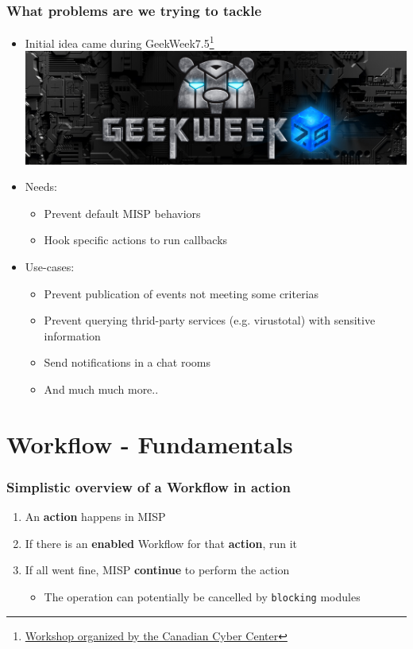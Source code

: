 \begin{frame}
    \frametitle{What problems are we trying to tackle}
    \begin{itemize}
        \item Initial idea came during GeekWeek7.5\footnote{\href{https://cyber.gc.ca/en/events/geekweek-75}{Workshop organized by the Canadian Cyber Center}} \includegraphics[width=0.3\linewidth]{pictures/geekweek75.jpg}
        \item Needs:
        \begin{itemize}
            \item Prevent default MISP behaviors
            \item Hook specific actions to run callbacks
        \end{itemize}
        \item Use-cases:
        \begin{itemize}
            \item Prevent publication of events not meeting some criterias
            \item Prevent querying thrid-party services (e.g. virustotal) with sensitive information
            \item Send notifications in a chat rooms
            \item And much much more..
        \end{itemize}
    \end{itemize}
\end{frame}

\section{Workflow - Fundamentals}
\begin{frame}
    \frametitle{Simplistic overview of a Workflow in action}
    \begin{enumerate}
        \item An \textbf{action} happens in MISP
        \item If there is an \textbf{enabled} Workflow for that \textbf{action}, run it
        \item If all went fine, MISP \textbf{continue} to perform the action
        \begin{itemize}
            \item The operation can potentially be cancelled by \texttt{blocking} modules
        \end{itemize}
    \end{enumerate}
\end{frame}

